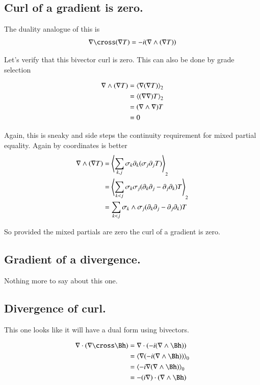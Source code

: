 \documentclass{article}
\begin{document}
\subsection{ Curl of a gradient is zero. }

The duality analogue of this is
\begin{align*}
\grad \cross (\grad T) = -i(\grad \wedge (\grad T))
\end{align*}

Let's verify that this bivector curl is zero.  This can also be done by grade selection

\begin{align*}
\nabla \wedge (\nabla T) 
&= {\left\langle{{\nabla(\nabla T)}}\right\rangle}_{2} \\
&= {\left\langle{{(\nabla\nabla) T}}\right\rangle}_{2} \\
&= (\nabla \wedge \nabla) T \\
&= 0
\end{align*}

Again, this is sneaky and side steps the continuity requirement for mixed partial equality.  Again by coordinates is better
\begin{align*}
\nabla \wedge (\nabla T) 
&= {\left\langle{{\sum_{k,j}\sigma_k \partial_k (\sigma_j \partial_j T)}}\right\rangle}_{2} \\
&= {\left\langle{{\sum_{k<j}\sigma_k \sigma_j (\partial_k \partial_j - \partial_j \partial_k) T}}\right\rangle}_{2} \\
&= \sum_{k<j} \sigma_k \wedge \sigma_j (\partial_k \partial_j - \partial_j \partial_k) T \\
\end{align*}

So provided the mixed partials are zero the curl of a gradient is zero.

\subsection{ Gradient of a divergence. }

Nothing more to say about this one.

\subsection{ Divergence of curl. }

This one looks like it will have a dual form using bivectors.

\begin{align*}
\grad \cdot (\grad \cross \Bh)
&= \grad \cdot (-i (\grad \wedge \Bh)) \\
&= \gpgradezero{\grad (-i (\grad \wedge \Bh))} \\
&= \gpgradezero{-i \grad (\grad \wedge \Bh)} \\
&= -(i \grad) \cdot (\grad \wedge \Bh) \\
\end{align*}
\end{document}
